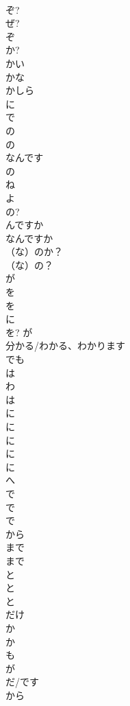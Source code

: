 \documentclass[8pt]{extreport}
\begin{document}
\begin{CJK}{UTF8}{min}
\\	ぞ?	
\\	ぜ?	
\\	ぞ		
\\	か?
\\	かい	
\\	かな	
\\	かしら		
\\	に	
\\	で	
\\	の	
\\	の 
\\	なんです	
\\	の 
\\	ね
\\	よ	
\\	の?	
\\	んですか 
\\	なんですか	
\\	（な）のか？		
\\	（な）の？	
\\	が	
\\	を		
\\	を	
\\	に	
\\	を?	が	
\\	分かる/わかる、わかります 
\\	でも	
\\	は	
\\	わ 
\\	は	
\\	に	
\\	に	
\\	に	
\\	に	
\\	に	
\\	へ	
\\	で	
\\	で	
\\	で	
\\	から		
\\	まで		
\\	まで		
\\	と	
\\	と	
\\	と	
\\	だけ		
\\	か 
\\	か		
\\	も		
\\	が 
\\	だ/です
\\	から	

\end{CJK}
\end{document}
